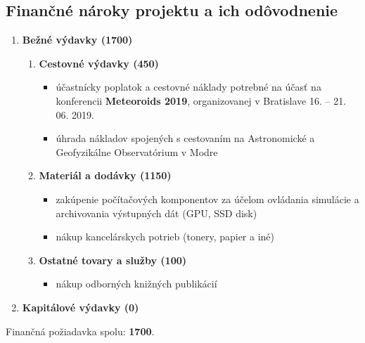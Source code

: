 \hypertarget{finanux10dnuxe9-nuxe1roky-projektu-a-ich-oduxf4vodnenie}{%
\subsection{Finančné nároky projektu a ich
odôvodnenie}\label{finanux10dnuxe9-nuxe1roky-projektu-a-ich-oduxf4vodnenie}}

\begin{enumerate}
\def\labelenumi{\arabic{enumi}.}
\tightlist
\item
  \textbf{Bežné výdavky (\SI{1700}{\eur})}

  \begin{enumerate}
  \def\labelenumii{\alph{enumii}.}
  \tightlist
  \item
    \textbf{Cestovné výdavky (\SI{450}{\eur})}

    \begin{itemize}
    \tightlist
    \item
      účastnícky poplatok a cestovné náklady potrebné na účasť na
      konferencii \textbf{Meteoroids 2019}, organizovanej v Bratislave
      16. -- 21. 06. 2019.
    \item
      úhrada nákladov spojených s cestovaním na Astronomické a
      Geofyzikálne Observatórium v Modre
    \end{itemize}
  \item
    \textbf{Materiál a dodávky (\SI{1150}{\eur})}

    \begin{itemize}
    \tightlist
    \item
      zakúpenie počítačových komponentov za účelom ovládania simulácie a
      archivovania výstupných dát (GPU, SSD disk)
    \item
      nákup kancelárskych potrieb (tonery, papier a iné)
    \end{itemize}
  \item
    \textbf{Ostatné tovary a služby (\SI{100}{\eur})}

    \begin{itemize}
    \tightlist
    \item
      nákup odborných knižných publikácií
    \end{itemize}
  \end{enumerate}
\item
  \textbf{Kapitálové výdavky (\SI{0}{\eur})}
\end{enumerate}

Finančná požiadavka spolu: \textbf{\SI{1700}{\eur}}.

